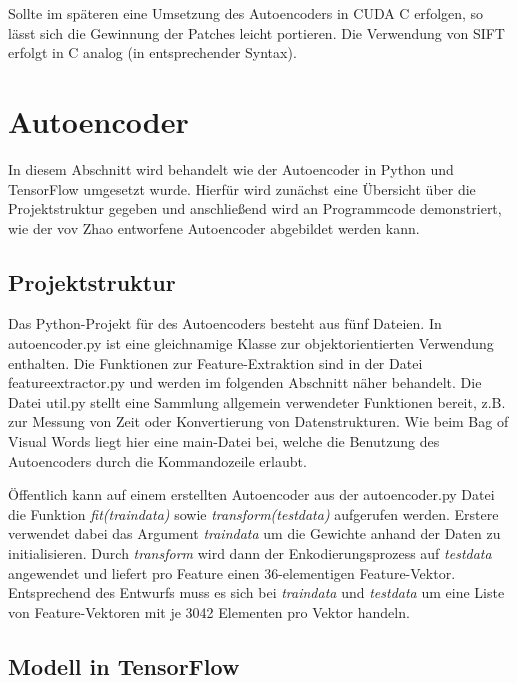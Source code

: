 Sollte im späteren eine Umsetzung des Autoencoders in CUDA C erfolgen, so lässt sich die Gewinnung der Patches leicht portieren. Die Verwendung von SIFT erfolgt in C analog (in entsprechender Syntax).

\section{Autoencoder}

In diesem Abschnitt wird behandelt wie der Autoencoder in Python und TensorFlow umgesetzt wurde. Hierfür wird zunächst eine Übersicht über die Projektstruktur gegeben und anschließend wird an Programmcode demonstriert, wie der vov Zhao entworfene Autoencoder abgebildet werden kann.

\subsection{Projektstruktur} Das Python-Projekt für des Autoencoders besteht aus fünf Dateien. In autoencoder.py ist eine gleichnamige Klasse zur objektorientierten Verwendung enthalten. Die Funktionen zur Feature-Extraktion sind in der Datei feature\textunderscore extractor.py und werden im folgenden Abschnitt näher behandelt. Die Datei util.py stellt eine Sammlung allgemein verwendeter Funktionen bereit, z.B. zur Messung von Zeit oder Konvertierung von Datenstrukturen. Wie beim Bag of Visual Words liegt hier eine main-Datei bei, welche die Benutzung des Autoencoders durch die Kommandozeile erlaubt.


Öffentlich kann auf einem erstellten Autoencoder aus der autoencoder.py Datei die Funktion \textit{fit(train\textunderscore data)} sowie \textit{transform(test\textunderscore data)} aufgerufen werden. Erstere verwendet dabei das Argument \textit{train\textunderscore data} um die Gewichte anhand der Daten zu initialisieren.  Durch \textit{transform} wird dann der Enkodierungsprozess auf \textit{test\textunderscore data} angewendet und liefert pro Feature einen 36-elementigen Feature-Vektor. Entsprechend des Entwurfs muss es sich bei \textit{train\textunderscore data} und \textit{test\textunderscore data} um eine Liste von Feature-Vektoren mit je 3042 Elementen pro Vektor handeln.

\subsection{Modell in TensorFlow}

